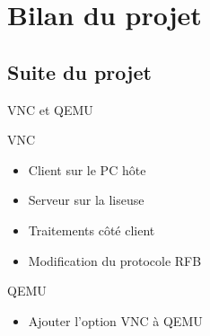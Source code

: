 \section[Bilan]{Bilan du projet}
\subsection[Suite]{Suite du projet}

\begin{frame}{VNC et QEMU}

\begin{block}{VNC}
	\begin{itemize}
		\item Client sur le PC hôte
		\item Serveur sur la liseuse
		\item Traitements côté client
		\item Modification du protocole RFB
	\end{itemize}
\end{block}

\begin{block}{QEMU}
	\begin{itemize}
		\item Ajouter l'option VNC à QEMU
	\end{itemize}
\end{block}

\end{frame}